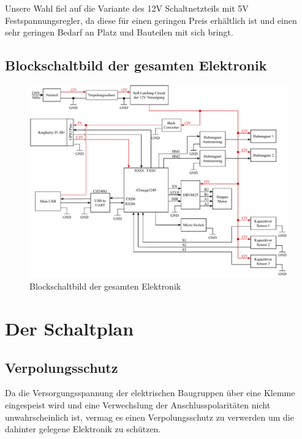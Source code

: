 Unsere Wahl fiel auf die Variante des 12V Schaltnetzteils mit 5V Festspannungsregler, da diese für einen geringen Preis erhältlich ist
und einen sehr geringen Bedarf an Platz und Bauteilen mit sich bringt.

\newpage

\subsection{Blockschaltbild der gesamten Elektronik}

\begin{figure}[hb]
    \centering
    \includegraphics[scale=0.85,page=1]{fig/elektro/ElectroBlockDiagram.pdf}
    \caption{Blockschaltbild der gesamten Elektronik}
\end{figure}

\newpage


\section{Der Schaltplan}

\subsection{Verpolungsschutz}

Da die Versorgungsspannung der elektrischen Baugruppen über eine Klemme eingespeist wird und eine Verwechslung
der Anschlusspolaritäten nicht unwahrscheinlich ist, vermag es einen Verpolungsschutz zu verwerden um die
dahinter gelegene Elektronik zu schützen.

